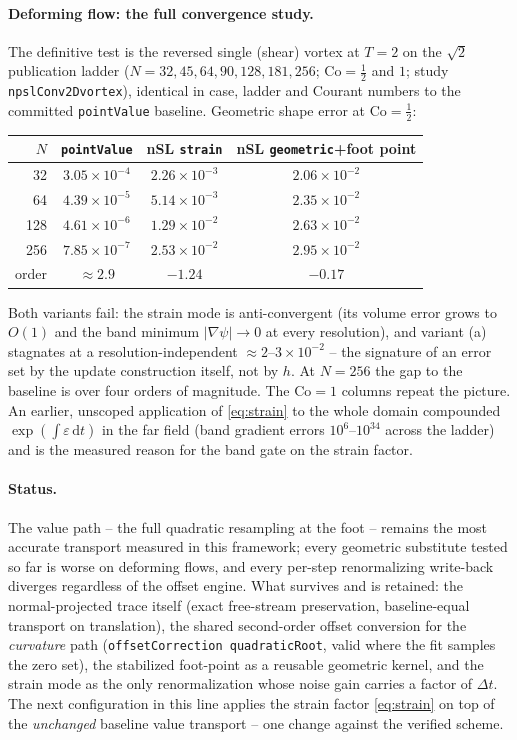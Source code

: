 \documentclass[preprint,3p,11pt]{elsarticle}
\newcommand{\psilev}{\psi}
\newcommand{\gradpsi}{\lvert\nabla\psilev\rvert}
\begin{document}
\paragraph{Deforming flow: the full convergence study.} The definitive test
is the reversed single (shear) vortex at $T=2$ on the $\sqrt2$ publication
ladder ($N=32,45,64,90,128,181,256$; $\mathrm{Co}=\tfrac12$ and $1$; study
\texttt{npslConv2Dvortex}), identical in case, ladder and Courant numbers to
the committed \texttt{pointValue} baseline. Geometric shape error at
$\mathrm{Co}=\tfrac12$:
\begin{center}\small
\begin{tabular}{rccc}
\toprule
$N$ & \texttt{pointValue} & nSL \texttt{strain} & nSL \texttt{geometric}+foot point \\
\midrule
 32 & $3.05\times10^{-4}$ & $2.26\times10^{-3}$ & $2.06\times10^{-2}$ \\
 64 & $4.39\times10^{-5}$ & $5.14\times10^{-3}$ & $2.35\times10^{-2}$ \\
128 & $4.61\times10^{-6}$ & $1.29\times10^{-2}$ & $2.63\times10^{-2}$ \\
256 & $7.85\times10^{-7}$ & $2.53\times10^{-2}$ & $2.95\times10^{-2}$ \\
\midrule
order & $\approx 2.9$ & $-1.24$ & $-0.17$ \\
\bottomrule
\end{tabular}
\end{center}
Both variants fail: the strain mode is anti-convergent (its volume error grows
to $O(1)$ and the band minimum $\gradpsi\to0$ at every resolution), and
variant (a) stagnates at a resolution-independent $\approx2$--$3\times10^{-2}$
-- the signature of an error set by the update construction itself, not by
$h$. At $N=256$ the gap to the baseline is over four orders of magnitude. The
$\mathrm{Co}=1$ columns repeat the picture. An earlier, unscoped application
of \eqref{eq:strain} to the whole domain compounded
$\exp(\int\varepsilon\,\mathrm dt)$ in the far field (band gradient errors
$10^{6}$--$10^{34}$ across the ladder) and is the measured reason for the band
gate on the strain factor.

\paragraph{Status.} The value path -- the full quadratic resampling at the
foot -- remains the most accurate transport measured in this framework; every
geometric substitute tested so far is worse on deforming flows, and every
per-step renormalizing write-back diverges regardless of the offset engine.
What survives and is retained: the normal-projected trace itself (exact
free-stream preservation, baseline-equal transport on translation), the
shared second-order offset conversion for the \emph{curvature} path
(\texttt{offsetCorrection quadraticRoot}, valid where the fit samples the
zero set), the stabilized foot-point as a reusable geometric kernel, and the
strain mode as the only renormalization whose noise gain carries a factor of
$\Delta t$. The next configuration in this line applies the strain factor
\eqref{eq:strain} on top of the \emph{unchanged} baseline value transport --
one change against the verified scheme.
\end{document}

